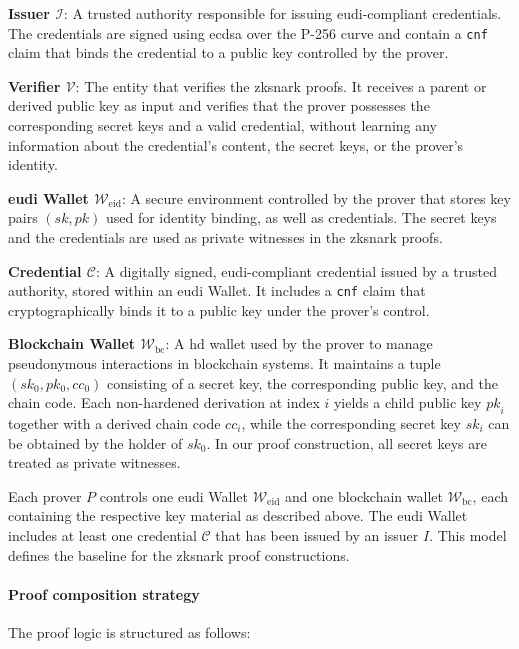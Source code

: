 \medskip
\textbf{Issuer $\mathcal{I}$}: A trusted authority responsible for issuing \acrshort{eudi}-compliant credentials. The credentials are signed using \acrshort{ecdsa} over the P-256 curve and contain a \texttt{cnf} claim that binds the credential to a public key controlled by the prover.

\medskip
\textbf{Verifier $\mathcal{V}$}: The entity that verifies the \acrshort{zksnark} proofs. It receives a parent or derived public key as input and verifies that the prover possesses the corresponding secret keys and a valid credential, without learning any information about the credential’s content, the secret keys, or the prover’s identity.

\medskip
\textbf{\acrshort{eudi} Wallet $\mathcal{W}_{\text{eid}}$}: A secure environment controlled by the prover that stores key pairs $(sk, pk)$ used for identity binding, as well as credentials. The secret keys and the credentials are used as private witnesses in the \acrshort{zksnark} proofs.

\medskip
\textbf{Credential $\mathcal{C}$}: A digitally signed, \acrshort{eudi}-compliant credential issued by a trusted authority, stored within an \acrshort{eudi} Wallet. It includes a \texttt{cnf} claim that cryptographically binds it to a public key under the prover’s control.

\medskip
\textbf{Blockchain Wallet $\mathcal{W}_{\text{bc}}$}: A \acrshort{hd} wallet used by the prover to manage pseudonymous interactions in blockchain systems. It maintains a tuple $(sk_0, pk_0, cc_0)$ consisting of a secret key, the corresponding public key, and the chain code. Each non-hardened derivation at index $\mathit{i}$ yields a child public key $\mathit{pk}_i$ together with a derived chain code $\mathit{cc}_i$, while the corresponding secret key $\mathit{sk}_i$ can be obtained by the holder of $\mathit{sk}_0$. In our proof construction, all secret keys are treated as private witnesses.

\medskip
Each prover $P$ controls one \acrshort{eudi} Wallet $\mathcal{W}_{\text{eid}}$ and one blockchain wallet $\mathcal{W}_{\text{bc}}$, each containing the respective key material as described above. The \acrshort{eudi} Wallet includes at least one credential $\mathcal{C}$ that has been issued by an issuer $I$. This model defines the baseline for the \acrshort{zksnark} proof constructions.

\paragraph{Proof composition strategy}
The proof logic is structured as follows:

